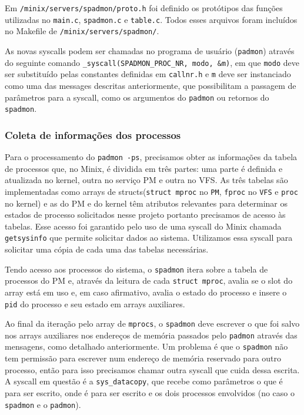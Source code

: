 \documentclass[12pt,journal,compsoc]{IEEEtran}
\begin{document}
Em \texttt{/minix/servers/spadmon/proto.h} foi definido os protótipos das funções utilizadas no \texttt{main.c}, \texttt{spadmon.c} e \texttt{table.c}. Todos esses arquivos foram incluídos no Makefile de \texttt{/minix/servers/spadmon/}.

As novas syscalls podem ser chamadas no programa de usuário (\texttt{padmon}) através do seguinte comando \texttt{\_syscall(SPADMON\_PROC\_NR, modo, \&m)}, em que \texttt{modo} deve ser substituído pelas constantes definidas em \texttt{callnr.h} e \texttt{m} deve ser instanciado como uma das messages descritas anteriormente, que possibilitam a passagem de parâmetros para a syscall, como os argumentos do \texttt{padmon} ou retornos do \texttt{spadmon}.

\subsubsection{Coleta de informações dos processos}

Para o processamento do \texttt{padmon -ps}, precisamos obter as informações da tabela de processos que, no Minix, é dividida em três partes: uma parte é definida e atualizada no kernel, outra no serviço PM e outra no VFS. As três tabelas são implementadas como arrays de structs(\texttt{struct mproc} no \texttt{PM}, \texttt{fproc} no \texttt{VFS} e \texttt{proc} no kernel) e as do PM e do kernel têm atributos relevantes para determinar os estados de processo solicitados nesse projeto portanto precisamos de acesso às tabelas. Esse acesso foi garantido pelo uso de uma syscall do Minix chamada \texttt{getsysinfo} que permite solicitar dados ao sistema. Utilizamos essa syscall para solicitar uma cópia de cada uma das tabelas necessárias.

Tendo acesso aos processos do sistema, o \texttt{spadmon} itera sobre a tabela de processos do PM e, através da leitura de cada \texttt{struct mproc}, avalia se o slot do array está em uso e, em caso afirmativo, avalia o estado do processo e insere o \texttt{pid} do processo e seu estado em arrays auxiliares.

Ao final da iteração pelo array de \texttt{mprocs}, o \texttt{spadmon} deve escrever o que foi salvo nos arrays auxiliares nos endereços de memória passados pelo \texttt{padmon} através das mensagens, como detalhado anteriormente. Um problema é que o \texttt{spadmon} não tem permissão para escrever num endereço de memória reservado para outro processo, então para isso precisamos chamar outra syscall que cuida dessa escrita. A syscall em questão é a \texttt{sys\_datacopy}, que recebe como parâmetros o que é para ser escrito, onde é para ser escrito e os dois processos envolvidos (no caso o \texttt{spadmon} e o \texttt{padmon}).
\end{document}
